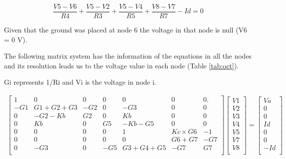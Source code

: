 \begin{equation}
\frac{V5 - V6}{R4} + \frac{V5 - V2}{R3} + \frac{V5 - V4}{R5} + \frac{V8 - V7}{R7} - Id = 0  
\end{equation}

Given that the ground was placed at node 6 the voltage in that node is null (V6 = 0 V).

The following matrix system has the information of the equations in all the nodes and its resolution leads us to the voltage value in each node (Table \ref{tab:oct}). 

Gi represents 1/Ri and Vi is the voltage in node i.

\begin{gather}
    \begin{bmatrix}
        1       &   0       & 0     &   0 & 0 &0 & 0. \\
        -G1      &   G1+G2+G3       & -G2     &   0 & -G3 &0 & 0  \\
        0       &   -G2-Kb       & G2     &   0 & Kb &0 & 0  \\   
        0 & Kb & 0 & G5 & -Kb-G5 & 0 & 0  \\
        0       &   0       & 0     &   0 & 1 & Kc \times G6 & -1  \\
        0       &   0       & 0     &   0 & 0 & G6+G7 & -G7  \\
        0 & -G3 & 0 & -G5 & G3+G4+G5 & -G7&G7 \\
    \end{bmatrix}
    \begin{bmatrix}
        V1     \\
        V2     \\
        V3     \\
        V4     \\
        V5     \\
        V7     \\
        V8     \\
    \end{bmatrix}
    =
    \begin{bmatrix}
        Va     \\
        0      \\
        0      \\
        Id     \\
        0      \\
        0      \\
        -Id    \\
    \end{bmatrix}
\end{gather}


